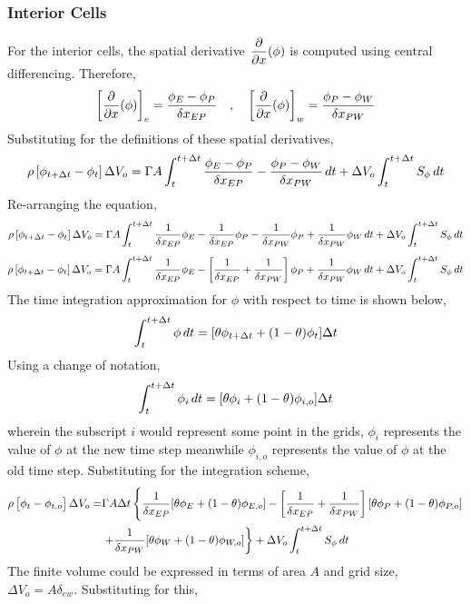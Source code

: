 \documentclass[a4paper, 12pt]{report}
\begin{document}
\begin{center}
\subsubsection{Interior Cells}
For the interior cells, the spatial derivative $\displaystyle{\frac{\partial}{\partial x}(\phi)}$ is computed using central differencing. Therefore, 
$$\left[\frac{\partial}{\partial x}(\phi)\right]_{e} = \frac{\phi_E - \phi_P}{\delta x_{EP}} \quad,\quad \left[\frac{\partial}{\partial x}(\phi)\right]_{w} = \frac{\phi_P - \phi_W}{\delta x_{PW}}$$
Substituting for the definitions of these spatial derivatives,
$$\rho \left[\phi_{t+\Delta t} - \phi_{t}\right]\Delta V_o = \Gamma A\int^{t+\Delta t}_{t}\frac{\phi_E - \phi_P}{\delta x_{EP}} - \frac{\phi_P - \phi_W}{\delta x_{PW}}\,dt + \Delta V_o\int^{t+\Delta t}_{t} S_\phi\,dt$$
Re-arranging the equation,
$$\rho \left[\phi_{t+\Delta t} - \phi_{t}\right]\Delta V_o = \Gamma A\int^{t+\Delta t}_{t} \frac{1}{\delta x_{EP}}\phi_E - \frac{1}{\delta x_{EP}}\phi_P - \frac{1}{\delta x_{PW}}\phi_P + \frac{1}{\delta x_{PW}}\phi_W\,dt + \Delta V_o\int^{t+\Delta t}_{t} S_\phi\,dt$$
$$\rho \left[\phi_{t+\Delta t} - \phi_{t}\right]\Delta V_o = \Gamma A\int^{t+\Delta t}_{t} \frac{1}{\delta x_{EP}}\phi_E - \left[\frac{1}{\delta x_{EP}} + \frac{1}{\delta x_{PW}}\right]\phi_P + \frac{1}{\delta x_{PW}}\phi_W\,dt + \Delta V_o\int^{t+\Delta t}_{t} S_\phi\,dt$$
The time integration approximation for $\phi$ with respect to time is shown below,
$$\int^{t+\Delta t}_{t} \phi\,dt = [\theta\phi_{t+\Delta t} + (1-\theta)\phi_{t}]\Delta t$$
Using a change of notation,
$$\int^{t+\Delta t}_{t} \phi_{i}\,dt = [\theta\phi_{i} + (1-\theta)\phi_{i,o}]\Delta t$$
wherein the subscript $i$ would represent some point in the grids, $\phi_{i}$ represents the value of $\phi$ at the new time step meanwhile $\phi_{i,o}$ represents the value of $\phi$ at the old time step. Substituting for the integration scheme,
\begin{equation*}
\begin{split}
\rho \left[\phi_{t} - \phi_{t,o}\right]\Delta V_o = & \Gamma A\Delta t\left\{\frac{1}{\delta x_{EP}}[\theta\phi_{E} + (1-\theta)\phi_{E,o}]  - \left[\frac{1}{\delta x_{EP}} + \frac{1}{\delta x_{PW}}\right][\theta\phi_{P} + (1-\theta)\phi_{P,o}]  \right.\\ & \left. + \frac{1}{\delta x_{PW}}[\theta\phi_{W} + (1-\theta)\phi_{W,o}]\right\} + \Delta V_o\int^{t+\Delta t}_{t} S_\phi\,dt
\end{split}
\end{equation*}
The finite volume could be expressed in terms of area $A$ and grid size, $\Delta V_o = A\delta_{ew}$. Substituting for this,
\begin{equation*}
\begin{split}

\end{split}
\end{equation*}
\end{center}
\end{document}
